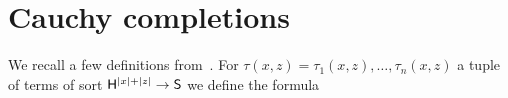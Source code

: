 \documentclass{amsproc}
\begin{document}
{\begin{comment}
\begin{proof}
  Let $\varphi(x)$ be a positive formula.
  We need to prove that for every $\varphi'>\varphi$ there is some formula $\psi(x)\in{\EuScript F}^{\rm p}_{{\sf S}{\rm qf}}$ such that $\varphi(x)\rightarrow\psi(x)\rightarrow\varphi'(x)$.
  By Corollary~\ref{corol_Lcomplete} and Proposition~\ref{prop_approx}

  \ceq{\hfill\neg\varphi(x)}{\rightarrow}{\bigvee_{p'(x)\rightarrow\neg\varphi(x)}p'(x)}

  where $p(x)$ ranges over the maximally consistent ${\EuScript F}^{\rm p}_{{\sf S}{\rm qf}}$-types.
  By Fact~\ref{fact_compactness_imp} and Lemma~\ref{lem_interpolation}

  \ceq{\hfill\neg\varphi(x)}{\rightarrow}{\bigvee_{\neg\tilde{\psi}(x)\rightarrow\neg\varphi(x)}\neg\tilde{\psi}(x),}

  where $\tilde{\psi}(x)\in{\EuScript F}^{\rm p}_{{\sf S}{\rm qf}}$.
  Equivalently,

  \ceq{\hfill\varphi(x)}{\leftarrow}{\bigwedge_{\tilde{\psi}(x)\leftarrow\varphi(x)}\tilde{\psi}(x).}

  By compactness, see Fact~\ref{fact_compactness_imp}, for every $\varphi'>\varphi$ there are some finitely many $\tilde{\psi}_i(x)\in{\EuScript F}^{\rm p}_{{\sf S}{\rm qf}}$ such that

  \ceq{\hfill\varphi'(x)}{\leftarrow}{\bigwedge_{i=1,\dots,n}\tilde{\psi}_i(x)\ \ \leftarrow\ \ \varphi(x)}

  which yields the interpolant required by the proposition.
\end{proof}


  
\end{comment}

\section{Cauchy completions}\label{Cauchy}

We recall a few definitions from~\cite{clcl}. For $\tau(x,z)=\tau_1(x,z),\dots,\tau_n(x,z)$ a tuple of terms of sort ${\sf H}^{|x|+|z|}\to {\sf S}$ we define the formula

}
\end{document}
